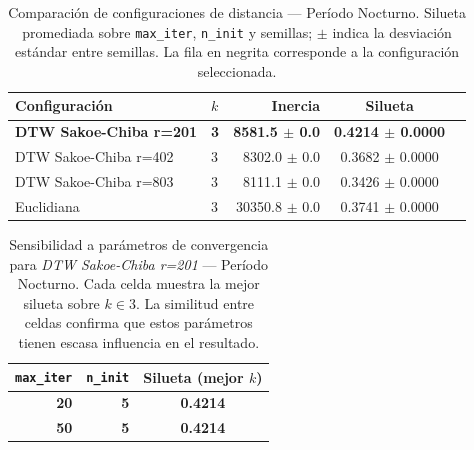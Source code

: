 

\begin{table}[ht]
  \centering
  \caption{Comparación de configuraciones de distancia — Período Nocturno. Silueta promediada sobre \texttt{max\_iter}, \texttt{n\_init} y semillas; $\pm$ indica la desviación estándar entre semillas. La fila en negrita corresponde a la configuración seleccionada.}
  \label{tab:tuning_config_nighttime}
  \begin{tabular}{llrcc}
    \toprule
    \textbf{Configuración} & \textbf{$k$} & \textbf{Inercia} & \textbf{Silueta} \\
    \midrule
    \textbf{DTW Sakoe-Chiba r=201} & \textbf{3} & \textbf{8581.5 $\pm$ 0.0} & \textbf{0.4214 $\pm$ 0.0000} \\
    DTW Sakoe-Chiba r=402 & 3 & 8302.0 $\pm$ 0.0 & 0.3682 $\pm$ 0.0000 \\
    DTW Sakoe-Chiba r=803 & 3 & 8111.1 $\pm$ 0.0 & 0.3426 $\pm$ 0.0000 \\
    Euclidiana & 3 & 30350.8 $\pm$ 0.0 & 0.3741 $\pm$ 0.0000 \\
    \bottomrule
  \end{tabular}
\end{table}

\begin{table}[ht]
  \centering
  \caption{Sensibilidad a parámetros de convergencia para \textit{DTW Sakoe-Chiba r=201} — Período Nocturno. Cada celda muestra la mejor silueta sobre $k \in {3}$. La similitud entre celdas confirma que estos parámetros tienen escasa influencia en el resultado.}
  \label{tab:tuning_conv_nighttime}
  \begin{tabular}{rrc}
    \toprule
    \textbf{\texttt{max\_iter}} & \textbf{\texttt{n\_init}} & \textbf{Silueta (mejor $k$)} \\
    \midrule
    \textbf{20} & \textbf{5} & \textbf{0.4214} \\
    \textbf{50} & \textbf{5} & \textbf{0.4214} \\
    \bottomrule
  \end{tabular}
\end{table}


